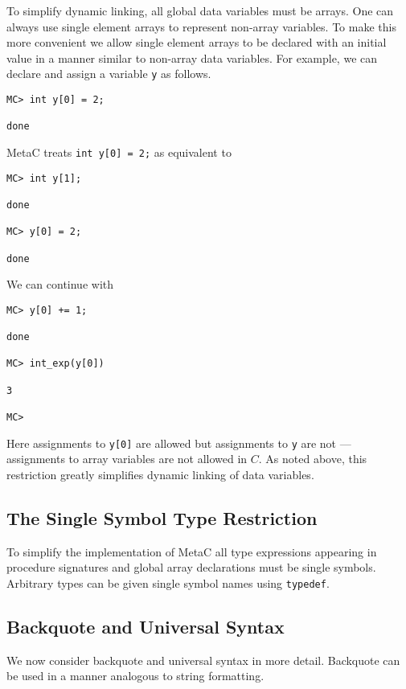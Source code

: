 \documentclass{article}
\begin{document}
To simplify dynamic linking, all global data
variables must be arrays. One can always use single element
arrays to represent non-array variables.  To make this more convenient
we allow single element arrays to be declared with an initial value in a
manner similar to non-array data variables.  For example, we can declare and assign a variable {\tt y}
as follows.

\begin{verbatim}
MC> int y[0] = 2;

done
\end{verbatim}

MetaC treats {\tt int y[0] = 2;} as equivalent to

\begin{verbatim}
MC> int y[1];

done

MC> y[0] = 2;

done
\end{verbatim}

We can continue with

\begin{verbatim}
MC> y[0] += 1;

done

MC> int_exp(y[0])

3

MC>
\end{verbatim}

Here assignments to {\tt y[0]} are allowed but assignments to {\tt y} are not --- assignments to array variables
are not allowed in $C$. As noted above, this restriction greatly simplifies dynamic linking of data variables.

\subsection{The Single Symbol Type Restriction}

To simplify the implementation of MetaC all type expressions appearing in procedure signatures and global array declarations must be single symbols.
Arbitrary types can be given single symbol names using {\tt typedef}.

\subsection{Backquote and Universal Syntax}

We now consider backquote and universal syntax in more detail.  Backquote can be used in a manner analogous to string formatting.
\end{document}

